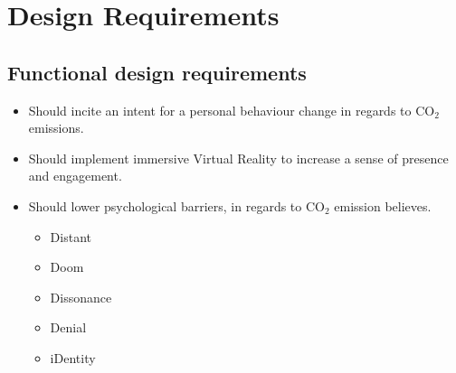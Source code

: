 \section{Design Requirements}\label{designReq}

\subsection{Functional design requirements}
\begin{itemize}
    \item Should incite an intent for a personal behaviour change in regards to CO$_2$ emissions.
    \item Should implement immersive Virtual Reality to increase a sense of presence and engagement.
    \item Should lower psychological barriers, in regards to CO$_2$ emission believes.\cite{the5Ds}
    \begin{itemize}
        \item Distant
        \item Doom
        \item Dissonance
        \item Denial
        \item iDentity
    \end{itemize}
\end{itemize}


